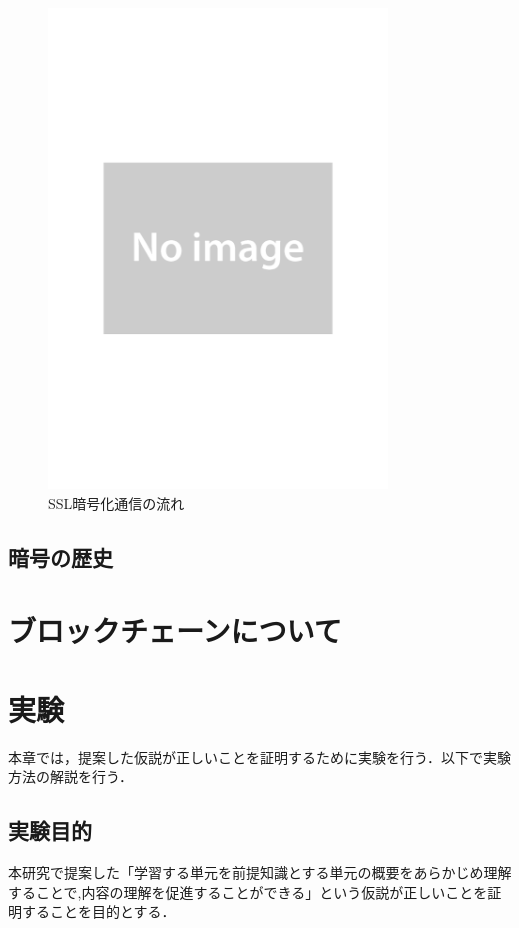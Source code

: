 \documentclass[a4j,12pt]{jsarticle}
\begin{document}
\begin{figure}[H]
\centering
\includegraphics[width=9cm]{noimage.pdf}
\caption{SSL暗号化通信の流れ}
\label{fig:no}
\end{figure} 



\subsection{暗号の歴史}







\newpage
\section{ブロックチェーンについて}

\newpage
\section{実験}
本章では，提案した仮説が正しいことを証明するために実験を行う．以下で実験方法の解説を行う．
\subsection{実験目的}
本研究で提案した「学習する単元を前提知識とする単元の概要をあらかじめ理解することで,内容の理解を促進することができる」という仮説が正しいことを証明することを目的とする．
\end{document}
